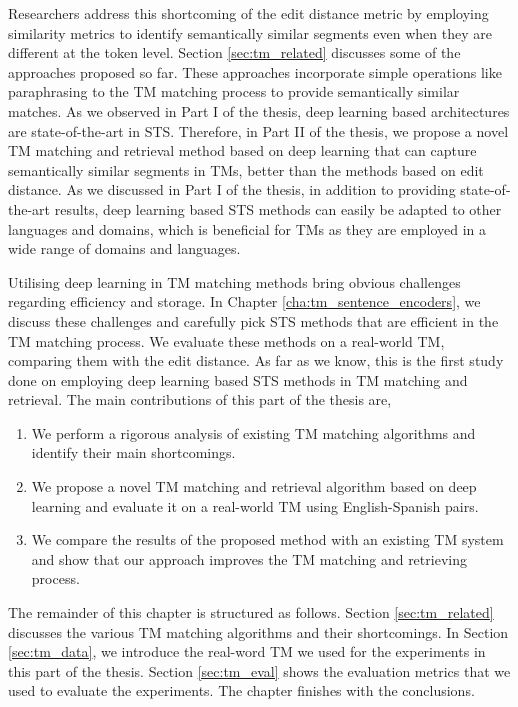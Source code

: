 Researchers address this shortcoming of the edit distance metric by employing similarity metrics to identify semantically similar segments even when they are different at the token level. Section \ref{sec:tm_related} discusses some of the approaches proposed so far. These approaches incorporate simple operations like paraphrasing to the TM matching process to provide semantically similar matches. As we observed in Part I of the thesis, deep learning based architectures are state-of-the-art in STS. Therefore, in Part II of the thesis, we propose a novel TM matching and retrieval method based on deep learning that can capture semantically similar segments in TMs, better than the methods based on edit distance. As we discussed in Part I of the thesis, in addition to providing state-of-the-art results, deep learning based STS methods can easily be adapted to other languages and domains, which is beneficial for TMs as they are employed in a wide range of domains and languages. 

Utilising deep learning in TM matching methods bring obvious challenges regarding efficiency and storage. In Chapter \ref{cha:tm_sentence_encoders}, we discuss these challenges and carefully pick STS methods that are efficient in the TM matching process. We evaluate these methods on a real-world TM, comparing them with the edit distance. As far as we know, this is the first study done on employing deep learning based STS methods in TM matching and retrieval. The main contributions of this part of the thesis are, 

\begin{enumerate}
	\item We perform a rigorous analysis of existing TM matching algorithms and identify their main shortcomings.
	\item We propose a novel TM matching and retrieval algorithm based on deep learning and evaluate it on a real-world TM using English-Spanish pairs. 
	\item We compare the results of the proposed method with an existing TM system and show that our approach improves the TM matching and retrieving process.
\end{enumerate}

The remainder of this chapter is structured as follows. Section \ref{sec:tm_related} discusses the various TM matching algorithms and their shortcomings. In Section \ref{sec:tm_data}, we introduce the real-word TM we used for the experiments in this part of the thesis. Section \ref{sec:tm_eval} shows the evaluation metrics that we used to evaluate the experiments. The chapter finishes with the conclusions. 

